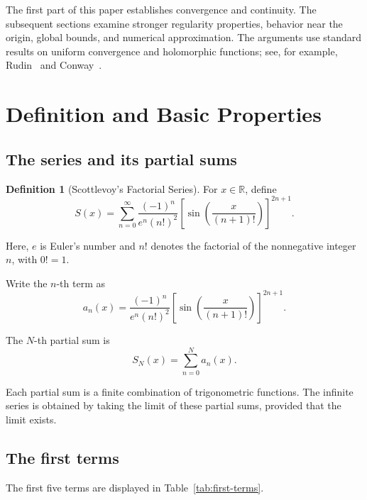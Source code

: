 \documentclass[12pt]{article}
\theoremstyle{definition}
\newtheorem{definition}[theorem]{Definition}
\theoremstyle{remark}
\begin{document}
The first part of this paper establishes convergence and
continuity. The subsequent sections examine stronger
regularity properties, behavior near the origin, global
bounds, and numerical approximation. The arguments use
standard results on uniform convergence and holomorphic
functions; see, for example, Rudin~\cite{rudin} and
Conway~\cite{conway}.

\section{Definition and Basic Properties}

\subsection{The series and its partial sums}

\begin{definition}[Scottlevoy's Factorial Series]
For \(x\in\mathbb{R}\), define
\[
S(x)=
\sum_{n=0}^{\infty}
\frac{(-1)^n}{e^n(n!)^2}
\left[
\sin\left(\frac{x}{(n+1)!}\right)
\right]^{2n+1}.
\]
\end{definition}

Here, \(e\) is Euler's number and \(n!\) denotes the factorial
of the nonnegative integer \(n\), with \(0!=1\).

Write the \(n\)-th term as
\[
a_n(x)=
\frac{(-1)^n}{e^n(n!)^2}
\left[
\sin\left(\frac{x}{(n+1)!}\right)
\right]^{2n+1}.
\]

The \(N\)-th partial sum is
\begin{equation}
S_N(x)=\sum_{n=0}^{N}a_n(x).
\label{eq:partial-sum}
\end{equation}

Each partial sum is a finite combination of trigonometric
functions. The infinite series is obtained by taking the
limit of these partial sums, provided that the limit exists.

\subsection{The first terms}

The first five terms are displayed in
Table~\ref{tab:first-terms}.
\end{document}
